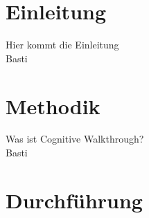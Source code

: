 \documentclass[	12pt, 
				a4paper, 
				BCOR=10mm, %
				DIV=12, 
				parskip=half, %
				headings=small, %
				twoside, %
				ngerman,
				bibliography=totoc,index=totoc, listof=totoc,
				numbers=noendperiod
				]{scrbook} %
\theoremstyle{plain}%
\theoremstyle{definition}
\theoremstyle{remark}
\begin{document}

\mainmatter %

\chapter{Einleitung}
Hier kommt die Einleitung\\
Basti

\chapter{Methodik}
Was ist Cognitive Walkthrough?\\
Basti

\chapter{Durchführung}
\end{document}
